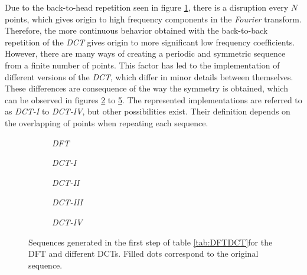 Due to the back-to-head repetition seen in figure \ref{subfig:dft}, there is a disruption every $N$ points, which gives origin to high frequency components in the \emph{Fourier} transform. Therefore, the more continuous behavior obtained with the back-to-back repetition of the \emph{DCT} gives origin to more significant low frequency coefficients. However, there are many ways of creating a periodic and symmetric sequence from a finite number of points. This factor has led to the implementation of different versions of the \emph{DCT}, which differ in minor details between themselves. These differences are consequence of the way the symmetry is obtained, which can be observed in figures \ref{subfig:dct1} to \ref{subfig:dct4}. The represented implementations are referred to as \emph{DCT-I} to \emph{DCT-IV}, but other possibilities exist. Their definition depends on the overlapping of points when repeating each sequence.

\begin{figure}[!htpb]
    \centering 
        \begin{subfigure}[c]{\textwidth}
            \centering
            
            \caption{\emph{DFT}}
            \label{subfig:dft}
        \end{subfigure}
        \begin{subfigure}[c]{0.45\textwidth}
            \centering
            
            \caption{\emph{DCT-I}}
            \label{subfig:dct1}
        \end{subfigure}
        \begin{subfigure}[c]{0.45\textwidth}
            \centering
            
            \caption{\emph{DCT-II}}
            \label{subfig:dct2}
        \end{subfigure}
        \begin{subfigure}[c]{0.45\textwidth}
            \centering
            
            \caption{\emph{DCT-III}}
            \label{subfig:dct3}
        \end{subfigure}
        \begin{subfigure}[c]{0.45\textwidth}
            \centering
            
            \caption{\emph{DCT-IV}}
            \label{subfig:dct4}
        \end{subfigure}
        \caption{Sequences generated in the first step of table \ref{tab:DFTDCT}for the DFT and different DCTs. Filled dots correspond to the original sequence.}
    \label{fig:2NSeq}
\end{figure}

